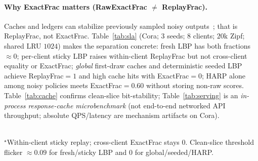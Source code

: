 \documentclass[conference]{IEEEtran}
\begin{document}
\paragraph{Why ExactFrac matters (RawExactFrac $\neq$ ReplayFrac).}
Caches and ledgers can stabilize previously sampled noisy outputs~\cite{crankshaw2017clipper,triton2024cache}; that is ReplayFrac, not ExactFrac.
Table~\ref{tab:sla} (Cora; 3 seeds; 8 clients; $20$k Zipf; shared LRU $1024$) makes the separation concrete: fresh LBP has both fractions ${\approx}0$; per-client sticky LBP raises within-client ReplayFrac but not cross-client equality or ExactFrac; \emph{global} first-draw caches and deterministic seeded LBP achieve ReplayFrac${=}1$ and high cache hits with ExactFrac${=}0$; HARP alone among noisy policies meets ExactFrac${=}0.60$ without storing non-raw scores.
Table~\ref{tab:cache} confirms clean-slice bit-stability; Table~\ref{tab:serving} is an \emph{in-process response-cache microbenchmark} (not end-to-end networked API throughput; absolute QPS/latency are mechanism artifacts on Cora).

\begin{table}[!t]
\caption{RawExactFrac vs ReplayFrac (Cora, 3 seeds). Global-cache and seeded LBP restore replay/cache without raw posterior equality; HARP meets ExactFrac${=}c$ without a non-raw ledger.}
\label{tab:sla}
\centering
{}\\[1pt]
{\footnotesize $^\star$Within-client sticky replay; cross-client ExactFrac stays $0$. Clean-slice threshold flicker ${\approx}0.09$ for fresh/sticky LBP and $0$ for global/seeded/HARP.}
\end{table}
\end{document}
